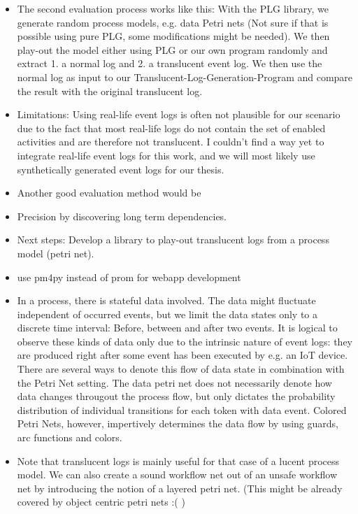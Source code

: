 \documentclass[a4paper,11pt,twoside]{pads-thesis}
\begin{document}
\begin{itemize}
        \item The second evaluation process works like this: With the PLG library, we generate random process models, e.g. data Petri nets (Not sure if that is possible using pure PLG, some modifications might be needed). We then play-out the model either using PLG or our own program randomly and extract 1. a normal log and 2. a translucent event log. We then use the normal log as input to our Translucent-Log-Generation-Program and compare the result with the original translucent log.

       \item Limitations: Using real-life event logs is often not plausible for our scenario due to the fact that most real-life logs do not contain the set of enabled activities and are therefore not translucent. I couldn't find a way yet to integrate real-life event logs for this work, and we will most likely use synthetically generated event logs for our thesis.

       \item Another good evaluation method would be 

        \item Precision by discovering long term dependencies.

        \item Next steps: Develop a library to play-out translucent logs from a process model (petri net).

        \item use pm4py instead of prom for webapp development

        \item In a process, there is stateful data involved. The data might fluctuate independent of occurred events, but we limit the data states only to a discrete time interval: Before, between and after two events. It is logical to observe these kinds of data only due to the intrinsic nature of event logs: they are produced right after some event has been executed by e.g. an IoT device. There are several ways to denote this flow of data state in combination with the Petri Net setting. The data petri net does not necessarily denote how data changes througout the process flow, but only dictates the probability distribution of individual transitions for each token with data event. Colored Petri Nets, however, impertively determines the data flow by using guards, arc functions and colors.
        
        \item Note that translucent logs is mainly useful for that case of a lucent process model. We can also create a sound workflow net out of an unsafe workflow net by introducing the notion of a layered petri net. (This might be already covered by object centric petri nets :( )
        

\end{itemize}
\end{document}
